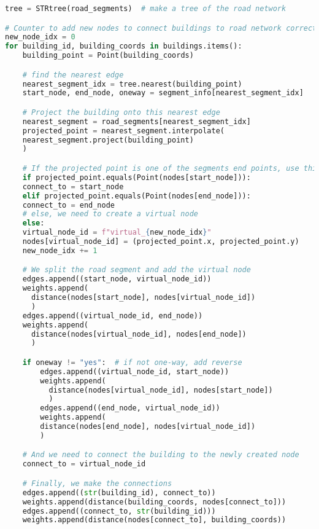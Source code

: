 \begin{lstlisting}[language=Python, caption={The algorithm to extract the edges to connect the buildings to the road network}, label={lst:python-edges}]
tree = STRtree(road_segments)  # make a tree of the road network

# Counter to add new nodes to connect buildings to road network correctly
new_node_idx = 0
for building_id, building_coords in buildings.items():
    building_point = Point(building_coords)

    # find the nearest edge
    nearest_segment_idx = tree.nearest(building_point)  
    start_node, end_node, oneway = segment_info[nearest_segment_idx]

    # Project the building onto this nearest edge
    nearest_segment = road_segments[nearest_segment_idx]
    projected_point = nearest_segment.interpolate(
	nearest_segment.project(building_point)
    )

    # If the projected point is one of the segments end points, use this
    if projected_point.equals(Point(nodes[start_node])):
	connect_to = start_node
    elif projected_point.equals(Point(nodes[end_node])):
	connect_to = end_node
    # else, we need to create a virtual node
    else:
	virtual_node_id = f"virtual_{new_node_idx}"
	nodes[virtual_node_id] = (projected_point.x, projected_point.y)
	new_node_idx += 1

	# We split the road segment and add the virtual node
	edges.append((start_node, virtual_node_id))
	weights.append(
	  distance(nodes[start_node], nodes[virtual_node_id])
	  )
	edges.append((virtual_node_id, end_node))
	weights.append(
	  distance(nodes[virtual_node_id], nodes[end_node])
	  )

	if oneway != "yes":  # if not one-way, add reverse
	    edges.append((virtual_node_id, start_node))
	    weights.append(
	      distance(nodes[virtual_node_id], nodes[start_node])
	      )
	    edges.append((end_node, virtual_node_id))
	    weights.append(
	    distance(nodes[end_node], nodes[virtual_node_id])
	    )

	# And we need to connect the building to the newly created node
	connect_to = virtual_node_id

    # Finally, we make the connections
    edges.append((str(building_id), connect_to))
    weights.append(distance(building_coords, nodes[connect_to]))
    edges.append((connect_to, str(building_id)))
    weights.append(distance(nodes[connect_to], building_coords))
\end{lstlisting}
